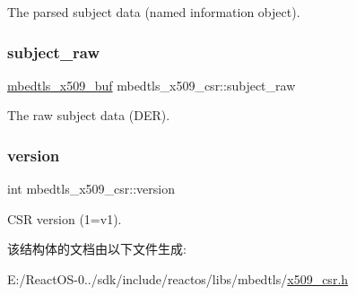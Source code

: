 The parsed subject data (named information object). \mbox{\label{structmbedtls__x509__csr_ad85a7b3987a80254911b8d48a1beb78f}} 
\subsubsection{\texorpdfstring{subject\+\_\+raw}{subject\_raw}}
{\footnotesize\ttfamily \hyperlink{group__x509__module_ga4d02c9e8e4e2934555e0d132cd2976dc}{mbedtls\+\_\+x509\+\_\+buf} mbedtls\+\_\+x509\+\_\+csr\+::subject\+\_\+raw}

The raw subject data (D\+ER). \mbox{\label{structmbedtls__x509__csr_a455e44fb96cdcd346788e0a41d7ab2b5}} 
\subsubsection{\texorpdfstring{version}{version}}
{\footnotesize\ttfamily int mbedtls\+\_\+x509\+\_\+csr\+::version}

C\+SR version (1=v1). 

该结构体的文档由以下文件生成\+:\begin{DoxyCompactItemize}
\item 
E\+:/\+React\+O\+S-\/0../sdk/include/reactos/libs/mbedtls/\hyperlink{x509__csr_8h}{x509\+\_\+csr.\+h}\end{DoxyCompactItemize}

